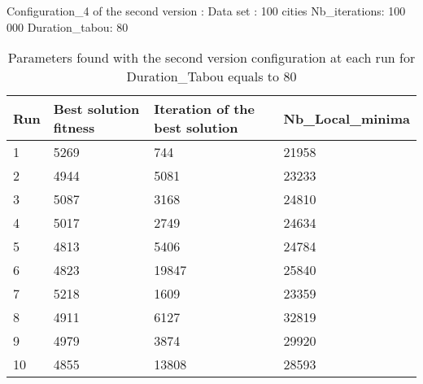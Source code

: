 \documentclass[12pt,oneside,a4paper]{article}
\begin{document}
  \newpage
  Configuration\_4 of the second version : 
\newline
Data set : 100 cities 
\newline
Nb\_iterations: 100 000 
\newline
Duration\_tabou: 80
\begin{table}[h]
    \centering
    \small
    \begin{tabular}{llll}
      \hline
      \multicolumn{1}{|l|}{\textbf{Run}}& \multicolumn{1}{l|}{\textbf{Best solution fitness}}& \multicolumn{1}{l|}{\textbf{Iteration of the best solution}}& \multicolumn{1}{l|}{\textbf{Nb\_Local\_minima}}\\ \hline
      \multicolumn{1}{|l|}{1} & \multicolumn{1}{l|}{5269}  & \multicolumn{1}{l|}{744} & \multicolumn{1}{l|}{21958}  \\ \hline
      \multicolumn{1}{|l|}{2} & \multicolumn{1}{l|}{4944}  & \multicolumn{1}{l|}{5081} & \multicolumn{1}{l|}{23233}  \\ \hline         
      \multicolumn{1}{|l|}{3} & \multicolumn{1}{l|}{5087}  & \multicolumn{1}{l|}{3168}  & \multicolumn{1}{l|}{24810}  \\ \hline
      \multicolumn{1}{|l|}{4} & \multicolumn{1}{l|}{5017}  & \multicolumn{1}{l|}{2749}  & \multicolumn{1}{l|}{24634}  \\ \hline
      \multicolumn{1}{|l|}{5} & \multicolumn{1}{l|}{4813}  & \multicolumn{1}{l|}{5406}  & \multicolumn{1}{l|}{24784}  \\ \hline
      \multicolumn{1}{|l|}{6} & \multicolumn{1}{l|}{4823}  & \multicolumn{1}{l|}{19847}  & \multicolumn{1}{l|}{25840}  \\ \hline
      \multicolumn{1}{|l|}{7} & \multicolumn{1}{l|}{5218}  & \multicolumn{1}{l|}{1609}  & \multicolumn{1}{l|}{23359 }  \\ \hline
      \multicolumn{1}{|l|}{8} & \multicolumn{1}{l|}{4911}  & \multicolumn{1}{l|}{6127} & \multicolumn{1}{l|}{32819}  \\ \hline
      \multicolumn{1}{|l|}{9} & \multicolumn{1}{l|}{4979}  & \multicolumn{1}{l|}{3874} & \multicolumn{1}{l|}{29920}  \\ \hline
      \multicolumn{1}{|l|}{10} & \multicolumn{1}{l|}{4855}  & \multicolumn{1}{l|}{13808} & \multicolumn{1}{l|}{28593}  \\ \hline
    \end{tabular}
    \caption{Parameters found with the second version configuration at each run for Duration\_Tabou equals to 80}
  \end{table}
  \newpage
\end{document}
